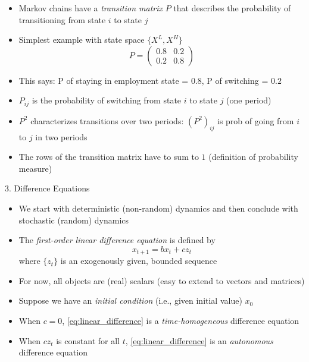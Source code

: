\documentclass[10pt]{beamer}
\begin{document}
\begin{frame}{}
\begin{itemize}
\item Markov chains have a \textit{transition matrix} $P$ that describes the probability of transitioning from state $i$ to state $j$

\item Simplest example with state space $\{X^L, X^H\}$
\begin{equation*}
	P = \begin{pmatrix} 0.8 & 0.2 \\ 0.2 & 0.8 \end{pmatrix}
\end{equation*}

\item This says: P of staying in employment state = $0.8$, P of switching = $0.2$

\item $P_{ij}$ is the probability of switching from state $i$ to state $j$ (one period)

\item $P^2$ characterizes transitions over two periods: $(P^2)_{ij}$ is prob of going from $i$ to $j$ in two periods

\item The rows of the transition matrix have to sum to $1$ (definition of probability measure)
\end{itemize}
\end{frame}



\begin{frame}{3. Difference Equations}
\begin{itemize}
\item We start with deterministic (non-random) dynamics and then conclude with stochastic (random) dynamics

\item The \textit{first-order linear difference equation} is defined by
\begin{equation}\label{eq:linear_difference}
	x_{t+1} = b x_t + c z_t 
\end{equation}
where $\{z_t\}$ is an exogenously given, bounded sequence

\item For now, all objects are (real) scalars (easy to extend to vectors and matrices)

\item Suppose we have an \textit{initial condition} (i.e., given initial value) $x_0$

\item When $c = 0$, \eqref{eq:linear_difference} is a \textit{time-homogeneous} difference equation

\item When $cz_t$ is constant for all $t$, \eqref{eq:linear_difference} is an \textit{autonomous} difference equation

\end{itemize}
\end{frame}
\end{document}
